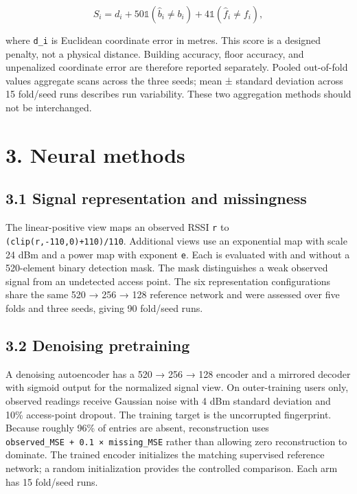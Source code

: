\documentclass[
  10pt,
  a4paper,
]{article}
\begin{document}
\[S_i=d_i+50\mathbb{1}(\widehat b_i\ne b_i)+4\mathbb{1}(\widehat f_i\ne f_i),\]

where \texttt{d\_i} is Euclidean coordinate error in metres. This score
is a designed penalty, not a physical distance. Building accuracy, floor
accuracy, and unpenalized coordinate error are therefore reported
separately. Pooled out-of-fold values aggregate scans across the three
seeds; mean ± standard deviation across 15 fold/seed runs describes run
variability. These two aggregation methods should not be interchanged.

\section{3. Neural methods}\label{neural-methods}

\subsection{3.1 Signal representation and
missingness}\label{signal-representation-and-missingness}

The linear-positive view maps an observed RSSI \texttt{r} to
\texttt{(clip(r,-110,0)+110)/110}. Additional views use an exponential
map with scale 24 dBm and a power map with exponent \texttt{e}. Each is
evaluated with and without a 520-element binary detection mask. The mask
distinguishes a weak observed signal from an undetected access point.
The six representation configurations share the same 520 → 256 → 128
reference network and were assessed over five folds and three seeds,
giving 90 fold/seed runs.

\subsection{3.2 Denoising pretraining}\label{denoising-pretraining}

A denoising autoencoder has a 520 → 256 → 128 encoder and a mirrored
decoder with sigmoid output for the normalized signal view. On
outer-training users only, observed readings receive Gaussian noise with
4 dBm standard deviation and 10\% access-point dropout. The training
target is the uncorrupted fingerprint. Because roughly 96\% of entries
are absent, reconstruction uses
\texttt{observed\_MSE\ +\ 0.1\ ×\ missing\_MSE} rather than allowing
zero reconstruction to dominate. The trained encoder initializes the
matching supervised reference network; a random initialization provides
the controlled comparison. Each arm has 15 fold/seed runs.
\end{document}
